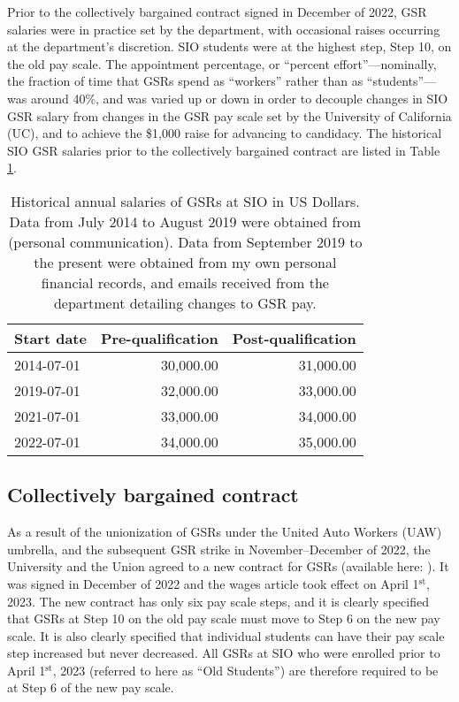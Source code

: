 \documentclass{article}
\begin{document}
Prior to the collectively bargained contract signed in December of 2022, GSR salaries were in practice set by the department, with occasional raises occurring at the department's discretion. SIO students were at the highest step, Step 10, on the old pay scale. The appointment percentage, or ``percent effort''---nominally, the fraction of time that GSRs spend as ``workers'' rather than as ``students''---was around 40\%, and was varied up or down in order to decouple changes in SIO GSR salary from changes in the GSR pay scale set by the University of California (UC), and to achieve the \$1,000 raise for advancing to candidacy. The historical SIO GSR salaries prior to the collectively bargained contract are listed in Table \ref{tab:pre_contract}.

\begin{table}[h]
	\centering
	\caption{Historical annual salaries of GSRs at SIO in US Dollars. Data from July 2014 to August 2019 were obtained from \cite{kachelein} (personal communication). Data from September 2019 to the present were obtained from my own personal financial records, and emails received from the department detailing changes to GSR pay.}
	\label{tab:pre_contract}
	\begin{tabular}{l r r}
		\hline		
		Start date & Pre-qualification & Post-qualification \\
		\hline
		2014-07-01 & 30,000.00 & 31,000.00 \\
		2019-07-01 & 32,000.00 & 33,000.00 \\
		2021-07-01 & 33,000.00 & 34,000.00 \\
		2022-07-01 & 34,000.00 & 35,000.00 \\
		\hline
	\end{tabular}
\end{table}

\subsection{Collectively bargained contract}

As a result of the unionization of GSRs under the United Auto Workers (UAW) umbrella, and the subsequent GSR strike in November--December of 2022, the University and the Union agreed to a new contract for GSRs (available here: \citep{gsr_contract}). It was signed in December of 2022 and the wages article took effect on April 1$^\text{st}$, 2023. The new contract has only six pay scale steps, and it is clearly specified that GSRs at Step 10 on the old pay scale must move to Step 6 on the new pay scale. It is also clearly specified that individual students can have their pay scale step increased but never decreased. All GSRs at SIO who were enrolled prior to April 1$^\text{st}$, 2023 (referred to here as ``Old Students'') are therefore required to be at Step 6 of the new pay scale.
\end{document}
